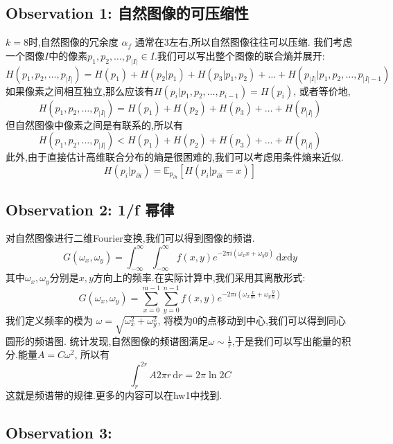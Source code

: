 \subsection{Observation 1: 自然图像的可压缩性}
$k=8$时,自然图像的冗余度 $\alpha_f$ 通常在3左右,所以自然图像往往可以压缩.
我们考虑一个图像$I$中的像素$p_1, p_2, \ldots, p_{|I|} \in I$.我们可以写出整个图像的联合熵并展开:
\begin{equation}
    H(p_1, p_2, \ldots, p_{|I|}) = H(p_1) + H(p_2 | p_1) + H(p_3 | p_1, p_2) + \ldots + H(p_{|I|} | p_1, p_2, \ldots, p_{|I|-1})
\end{equation}
如果像素之间相互独立,那么应该有$H(p_i | p_1, p_2, \ldots, p_{i-1}) = H(p_i)$, 或者等价地,
\begin{equation}
    H(p_1, p_2, \ldots, p_{|I|}) = H(p_1) + H(p_2) + H(p_3) + \ldots + H(p_{|I|})
\end{equation}
但自然图像中像素之间是有联系的,所以有
\begin{equation}
    H(p_1, p_2, \ldots, p_{|I|}) < H(p_1) + H(p_2) + H(p_3) + \ldots + H(p_{|I|})
\end{equation}
此外,由于直接估计高维联合分布的熵是很困难的,我们可以考虑用条件熵来近似.
\begin{equation}
    H(p_i | p_{\partial i}) = \mathbb{E}_{p_{\partial i}}[H(p_i | p_{\partial i} = x)] 
\end{equation}
\subsection{Observation 2: 1/f 幂律}
对自然图像进行二维Fourier变换,我们可以得到图像的频谱.
\begin{equation}
    G(\omega_x, \omega_y) = \int_{-\infty}^{\infty} \int_{-\infty}^{\infty} f(x, y) e^{-2\pi i (\omega_x x+\omega_y y)} \,\mathrm{d}x\mathrm{d}y
\end{equation}
其中$\omega_x, \omega_y$分别是$x, y$方向上的频率.在实际计算中,我们采用其离散形式:
\begin{equation}
    G(\omega_x, \omega_y) = \sum_{x=0}^{m-1} \sum_{y=0}^{n-1} f(x, y) e^{-2\pi i (\omega_x \frac{x}{m}+\omega_y \frac{y}{n})}
\end{equation}
我们定义频率的模为 $\omega = \sqrt{\omega_x^2 + \omega_y^2}$, 将模为0的点移动到中心,我们可以得到同心圆形的频谱图.
统计发现,自然图像的频谱图满足$\omega \sim \frac{1}{r}$,于是我们可以写出能量的积分.能量$A = C\omega^2$, 所以有
\begin{equation}
    \int_{r}^{2r} A 2\pi r \,\mathrm{d}r  = 2\pi \ln 2 C
\end{equation}
这就是频谱带的规律.更多的内容可以在hw1中找到.
\subsection{Observation 3: }
